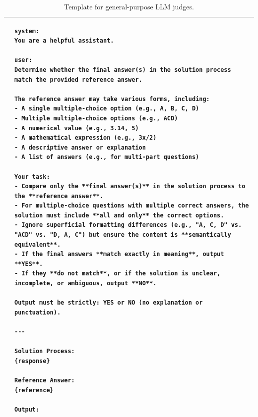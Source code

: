 \begin{table}
\centering
\footnotesize
\begin{tabular}{lp{12cm}}
\toprule

&
\begin{lstlisting}[basicstyle=\ttfamily\scriptsize, breaklines=true, aboveskip=0pt, belowskip=0pt]
system:
You are a helpful assistant.

user:
Determine whether the final answer(s) in the solution process match the provided reference answer.

The reference answer may take various forms, including:
- A single multiple-choice option (e.g., A, B, C, D)
- Multiple multiple-choice options (e.g., ACD)
- A numerical value (e.g., 3.14, 5)
- A mathematical expression (e.g., 3x/2)
- A descriptive answer or explanation
- A list of answers (e.g., for multi-part questions)

Your task:
- Compare only the **final answer(s)** in the solution process to the **reference answer**.
- For multiple-choice questions with multiple correct answers, the solution must include **all and only** the correct options.
- Ignore superficial formatting differences (e.g., "A, C, D" vs. "ACD" vs. "D, A, C") but ensure the content is **semantically equivalent**.
- If the final answers **match exactly in meaning**, output **YES**.
- If they **do not match**, or if the solution is unclear, incomplete, or ambiguous, output **NO**.

Output must be strictly: YES or NO (no explanation or punctuation).

---

Solution Process:  
{response}

Reference Answer:  
{reference}

Output:
\end{lstlisting}
\\
\bottomrule
\end{tabular}
\caption{Template for general-purpose LLM judges.}
\label{tab:appendix:grade_template_general_nq}
\end{table}







\newcommand{\smallsmalldatasetrow}[1]{
  \addlinespace[3pt]\rowcolor{green!16}%
  \multicolumn{5}{c}{\fontsize{12.5}{13}\selectfont\bfseries #1}\\
  \addlinespace[1pt]\midrule
}



